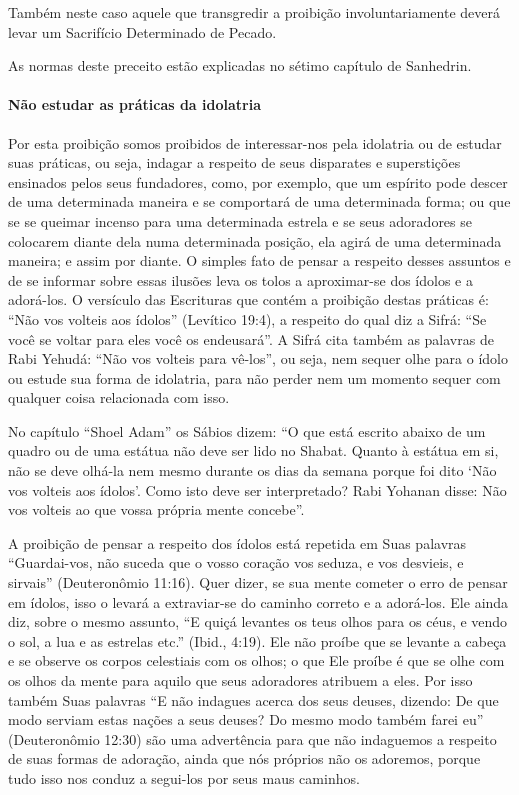 Também neste caso aquele que transgredir a proibição involuntariamente
deverá levar um Sacrifício Determinado de Pecado.

As normas deste preceito estão explicadas no sétimo capítulo de Sanhedrin.

\paragraph{Não estudar as práticas da idolatria}

Por esta proibição somos proibidos de interessar-nos pela idolatria ou
de estudar suas práticas, ou seja, indagar a respeito de seus disparates
e superstições ensinados pelos seus fundadores, como, por exemplo, que
um espírito pode descer de uma determinada maneira e se comportará de
uma determinada forma; ou que se se queimar incenso para uma determinada
estrela e se seus adoradores se colocarem diante dela numa determinada
posição, ela agirá de uma determinada maneira; e assim por diante. O
simples fato de pensar a respeito desses assuntos e de se informar sobre
essas ilusões leva os tolos a aproximar-se dos ídolos e a adorá-los. O
versículo das Escrituras que contém a proibição destas práticas é:
``Não vos volteis aos ídolos'' (Levítico 19:4), a respeito do qual diz a
Sifrá: ``Se você se voltar para eles você os endeusará''. A Sifrá cita
também as palavras de Rabi Yehudá: ``Não vos volteis para vê-los'', ou seja,
nem sequer olhe para o ídolo ou estude sua forma de idolatria, para não
perder nem um momento sequer com qualquer coisa relacionada com isso.

No capítulo ``Shoel Adam'' os Sábios dizem: ``O que está escrito abaixo
de um quadro ou de uma estátua não deve ser lido no Shabat. Quanto à
estátua em si, não se deve olhá-la nem mesmo durante os dias da semana
porque foi dito `Não vos volteis aos ídolos'. Como isto deve ser
interpretado? Rabi Yohanan disse: Não vos volteis ao que vossa própria
mente concebe''.

A proibição de pensar a respeito dos ídolos está repetida em Suas
palavras ``Guardai-vos, não suceda que o vosso coração vos seduza, e vos
desvieis, e sirvais'' (Deuteronômio 11:16). Quer dizer, se sua mente
cometer o erro de pensar em ídolos, isso o levará a extraviar-se do
caminho correto e a adorá-los. Ele ainda diz, sobre o mesmo assunto, ``E
quiçá levantes os teus olhos para os céus, e vendo o sol, a lua e as
estrelas etc.'' (Ibid., 4:19). Ele não proíbe que se levante a cabeça e
se observe os corpos celestiais com os olhos; o que Ele proíbe é que se
olhe com os olhos da mente para aquilo que seus adoradores atribuem a
eles. Por isso também Suas palavras ``E não indagues acerca dos seus
deuses, dizendo: De que modo serviam estas nações a seus deuses? Do
mesmo modo também farei eu'' (Deuteronômio 12:30) são uma advertência
para que não indaguemos a respeito de suas formas de adoração, ainda que
nós próprios não os adoremos, porque tudo isso nos conduz a segui-los
por seus maus caminhos.

